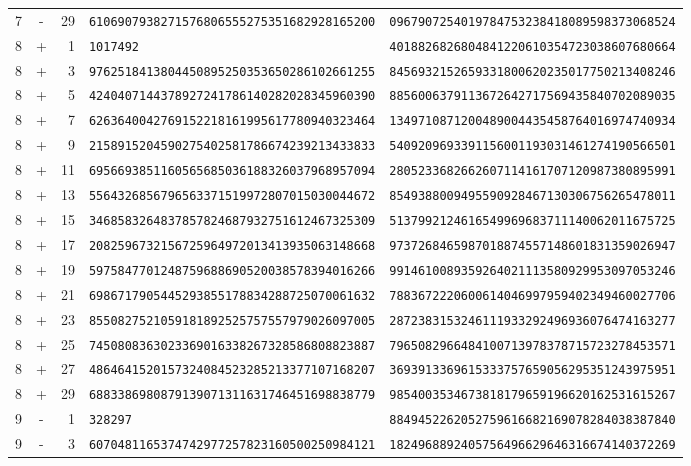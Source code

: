 \begin{longtable}{@{}rcrll@{}}
7&-&29&\texttt{6106907938271576806555275351682928165200}&\texttt{0967907254019784753238418089598373068524}\\
8&+&1&\texttt{1017492}&\texttt{4018826826804841220610354723038607680664}\\
8&+&3&\texttt{9762518413804450895250353650286102661255}&\texttt{8456932152659331800620235017750213408246}\\
8&+&5&\texttt{4240407144378927241786140282028345960390}&\texttt{8856006379113672642717569435840702089035}\\
8&+&7&\texttt{6263640042769152218161995617780940323464}&\texttt{1349710871200489004435458764016974740934}\\
8&+&9&\texttt{2158915204590275402581786674239213433833}&\texttt{5409209693391156001193031461274190566501}\\
8&+&11&\texttt{6956693851160565685036188326037968957094}&\texttt{2805233682662607114161707120987380895991}\\
8&+&13&\texttt{5564326856796563371519972807015030044672}&\texttt{8549388009495590928467130306756265478011}\\
8&+&15&\texttt{3468583264837857824687932751612467325309}&\texttt{5137992124616549969683711140062011675725}\\
8&+&17&\texttt{2082596732156725964972013413935063148668}&\texttt{9737268465987018874557148601831359026947}\\
8&+&19&\texttt{5975847701248759688690520038578394016266}&\texttt{9914610089359264021113580929953097053246}\\
8&+&21&\texttt{6986717905445293855178834288725070061632}&\texttt{7883672220600614046997959402349460027706}\\
8&+&23&\texttt{8550827521059181892525757557979026097005}&\texttt{2872383153246111933292496936076474163277}\\
8&+&25&\texttt{7450808363023369016338267328586808823887}&\texttt{7965082966484100713978378715723278453571}\\
8&+&27&\texttt{4864641520157324084523285213377107168207}&\texttt{3693913369615333757659056295351243975951}\\
8&+&29&\texttt{6883386980879139071311631746451698838779}&\texttt{9854003534673818179659196620162531615267}\\
9&-&1&\texttt{328297}&\texttt{8849452262052759616682169078284038387840}\\
9&-&3&\texttt{6070481165374742977257823160500250984121}&\texttt{1824968892405756496629646316674140372269}\\

\end{longtable}

